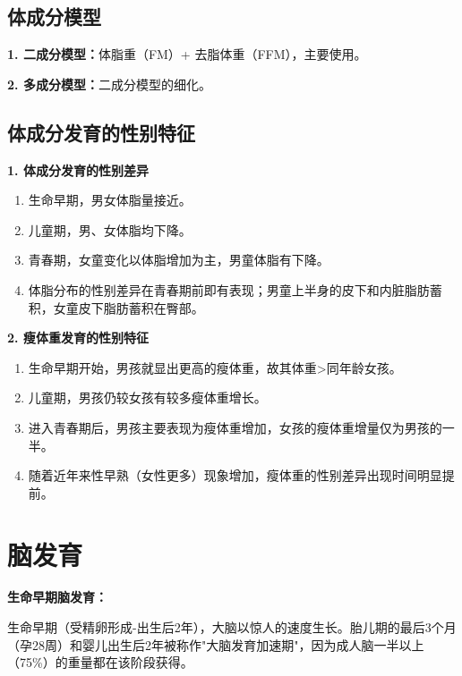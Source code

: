 \subsection{体成分模型}

\begin{keybox}
\textbf{1. 二成分模型：}体脂重（FM）+ 去脂体重（FFM），主要使用。

\textbf{2. 多成分模型：}二成分模型的细化。
\end{keybox}

\subsection{体成分发育的性别特征}

\begin{keybox}
\textbf{1. 体成分发育的性别差异}

\begin{enumerate}[leftmargin=*]
    \item 生命早期，男女体脂量接近。
    \item 儿童期，男、女体脂均下降。
    \item 青春期，女童变化以体脂增加为主，男童体脂有下降。
    \item 体脂分布的性别差异在青春期前即有表现；男童上半身的皮下和内脏脂肪蓄积，女童皮下脂肪蓄积在臀部。
\end{enumerate}

\textbf{2. 瘦体重发育的性别特征}

\begin{enumerate}[leftmargin=*]
    \item 生命早期开始，男孩就显出更高的瘦体重，故其体重>同年龄女孩。
    \item 儿童期，男孩仍较女孩有较多瘦体重增长。
    \item 进入青春期后，男孩主要表现为瘦体重增加，女孩的瘦体重增量仅为男孩的一半。
    \item 随着近年来性早熟（女性更多）现象增加，瘦体重的性别差异出现时间明显提前。
\end{enumerate}
\end{keybox}

\section{脑发育}

\begin{keybox}
\textbf{生命早期脑发育：}

生命早期（受精卵形成-出生后2年），大脑以惊人的速度生长。胎儿期的最后3个月（孕28周）和婴儿出生后2年被称作"大脑发育加速期"，因为成人脑一半以上（75\%）的重量都在该阶段获得。
\end{keybox}

